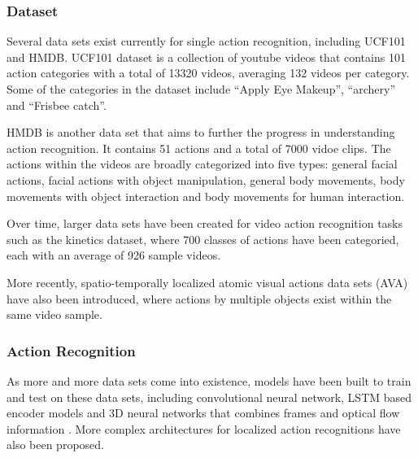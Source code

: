 \documentclass[
	a4paper, %
	10pt, %
	unnumberedsections, %
	twoside, %
]{t0004}
\begin{document}
\subsubsection{Dataset} Several data sets exist currently for single action recognition, including UCF101\cite{Soomro:2012qr} and HMDB\cite{Kuehne11}. UCF101 dataset is a collection of youtube videos that contains 101 action categories with a total of 13320 videos, averaging 132 videos per category. Some of the categories in the dataset include ``Apply Eye Makeup'', ``archery'' and ``Frisbee catch''.

HMDB\cite{Kuehne11} is another data set that aims to further the progress in understanding action recognition.  It contains 51 actions and a total of 7000 vidoe clips. The actions within the videos are broadly categorized into five types: general facial actions, facial actions with object manipulation, general body movements, body movements with object interaction and body movements for human interaction.

Over time, larger data sets have been created for video action recognition tasks such as the kinetics dataset\cite{Smaira:2020qr}, where 700 classes of actions have been categoried, each with an average of 926 sample videos.

More recently, spatio-temporally localized atomic visual actions data sets (AVA)\cite{Gu:2018qr} have also been introduced, where actions by multiple objects exist within the same video sample.

\subsubsection{Action Recognition} As more and more data sets come into existence, models have been built to train and test on these data sets, including convolutional neural network, LSTM\cite{Carreira:2018qr} based encoder models and 3D neural networks that combines frames and optical flow information \cite{Carreira:2018qr}. More complex architectures for localized action recognitions have also been proposed\cite{Wu:2023qr}.
\end{document}

